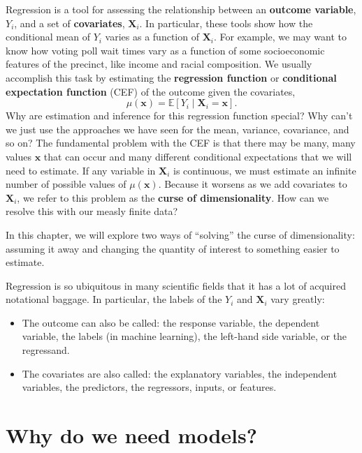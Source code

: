 \documentclass[
  letterpaper,
  DIV=11,
  numbers=noendperiod]{scrreprt}
\providecommand{\tightlist}{%
  \setlength{\itemsep}{0pt}\setlength{\parskip}{0pt}}\usepackage{longtable,booktabs,array}
\newcommand{\mb}{\symbf}
\newcommand{\E}{\mathbb{E}}
\newcommand{\X}{\mb{X}}
\newcommand{\bfx}{\mb{x}}
\theoremstyle{definition}
\theoremstyle{definition}
\theoremstyle{plain}
\theoremstyle{remark}
\begin{document}
Regression is a tool for assessing the relationship between an
\textbf{outcome variable}, \(Y_i\), and a set of \textbf{covariates},
\(\X_i\). In particular, these tools show how the conditional mean of
\(Y_i\) varies as a function of \(\X_i\). For example, we may want to
know how voting poll wait times vary as a function of some socioeconomic
features of the precinct, like income and racial composition. We usually
accomplish this task by estimating the \textbf{regression function} or
\textbf{conditional expectation function} (CEF) of the outcome given the
covariates, \[
\mu(\bfx) = \E[Y_i \mid \X_i = \bfx].
\] Why are estimation and inference for this regression function
special? Why can't we just use the approaches we have seen for the mean,
variance, covariance, and so on? The fundamental problem with the CEF is
that there may be many, many values \(\bfx\) that can occur and many
different conditional expectations that we will need to estimate. If any
variable in \(\X_i\) is continuous, we must estimate an infinite number
of possible values of \(\mu(\bfx)\). Because it worsens as we add
covariates to \(\X_i\), we refer to this problem as the \textbf{curse of
dimensionality}. How can we resolve this with our measly finite data?

In this chapter, we will explore two ways of ``solving'' the curse of
dimensionality: assuming it away and changing the quantity of interest
to something easier to estimate.

Regression is so ubiquitous in many scientific fields that it has a lot
of acquired notational baggage. In particular, the labels of the \(Y_i\)
and \(\X_i\) vary greatly:

\begin{itemize}
\tightlist
\item
  The outcome can also be called: the response variable, the dependent
  variable, the labels (in machine learning), the left-hand side
  variable, or the regressand.
\item
  The covariates are also called: the explanatory variables, the
  independent variables, the predictors, the regressors, inputs, or
  features.
\end{itemize}

\hypertarget{why-do-we-need-models}{%
\section{Why do we need models?}\label{why-do-we-need-models}}
\end{document}
